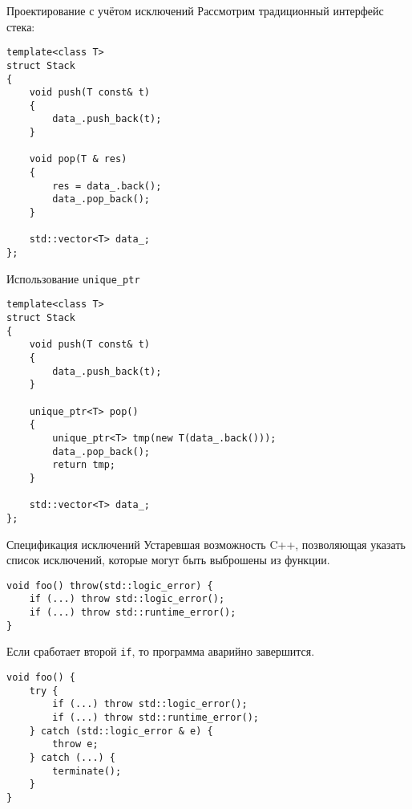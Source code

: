 \documentclass{beamer}
\begin{document}
\begin{frame}[fragile]{Проектирование с учётом исключений}
    Рассмотрим традиционный интерфейс стека:
\begin{lstlisting}
template<class T> 
struct Stack 
{
    void push(T const& t) 
    { 
        data_.push_back(t); 
    }

    void pop(T & res) 
    {
        res = data_.back();
        data_.pop_back();
    }

    std::vector<T> data_;
};
\end{lstlisting}
\end{frame}

\begin{frame}[fragile]{Использование {\tt unique\_ptr}}
\begin{lstlisting}
template<class T> 
struct Stack 
{
    void push(T const& t) 
    { 
        data_.push_back(t); 
    }

    unique_ptr<T> pop() 
    {
        unique_ptr<T> tmp(new T(data_.back()));
        data_.pop_back();
        return tmp;
    }

    std::vector<T> data_;
};
\end{lstlisting}
\end{frame}


%
%
%


\begin{frame}[fragile]{Спецификация исключений}
Устаревшая возможность C++,
позволяющая указать список исключений, которые могут быть выброшены из функции.
\begin{lstlisting}
void foo() throw(std::logic_error) {
    if (...) throw std::logic_error();
    if (...) throw std::runtime_error();
}               
\end{lstlisting}
Если сработает второй {\tt if}, то программа аварийно завершится.
\begin{lstlisting}
void foo() {
    try {
        if (...) throw std::logic_error();
        if (...) throw std::runtime_error();
    } catch (std::logic_error & e) { 
        throw e;
    } catch (...) { 
        terminate();
    }
}
\end{lstlisting}
\end{frame}
\end{document}
